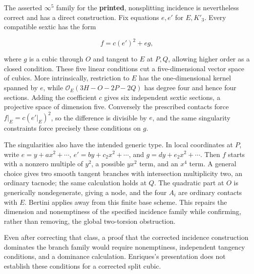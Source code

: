 The asserted \(\infty^5\) family for the \textbf{printed}, nonsplitting incidence is nevertheless correct and has a direct construction. Fix equations \(e,e'\) for \(E,K'_3\). Every compatible sextic has the form

\[
f=c(e')^2+e g,
\]

where \(g\) is a cubic through \(O\) and tangent to \(E\) at \(P,Q\), allowing higher order as a closed condition. These five linear conditions cut a five-dimensional vector space of cubics. More intrinsically, restriction to \(E\) has the one-dimensional kernel spanned by \(e\), while \(\mathcal O_E(3H-O-2P-2Q)\) has degree four and hence four sections. Adding the coefficient \(c\) gives six independent sextic sections, a projective space of dimension five. Conversely the prescribed contacts force \(f\vert _E=c(e'\vert _E)^2\), so the difference is divisible by \(e\), and the same singularity constraints force precisely these conditions on \(g\).

The singularities also have the intended generic type. In local coordinates at \(P\), write \(e=y+a x^2+\cdots\), \(e'=b y+c_2x^2+\cdots\), and \(g=d y+e_2x^2+\cdots\). Then \(f\) starts with a nonzero multiple of \(y^2\), a possible \(yx^2\) term, and an \(x^4\) term. A general choice gives two smooth tangent branches with intersection multiplicity two, an ordinary tacnode; the same calculation holds at \(Q\). The quadratic part at \(O\) is generically nondegenerate, giving a node, and the four \(A_i\) are ordinary contacts with \(E\). Bertini applies away from this finite base scheme. This repairs the dimension and nonemptiness of the specified incidence family while confirming, rather than removing, the global two-torsion obstruction.

Even after correcting that class, a proof that the corrected incidence construction dominates the branch family would require nonemptiness, independent tangency conditions, and a dominance calculation. Enriques's presentation does not establish these conditions for a corrected split cubic.

